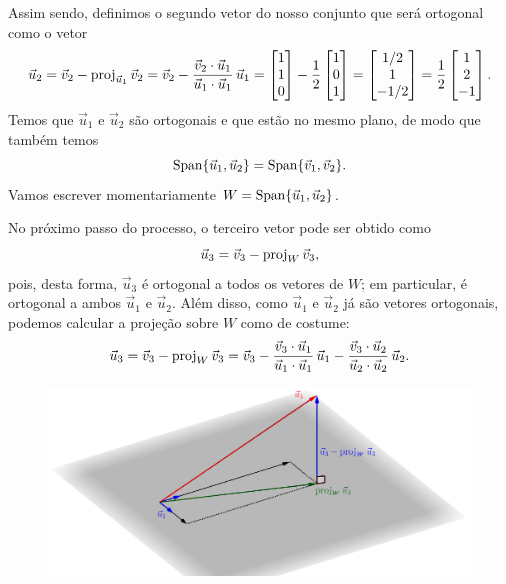 \begin{ex}
\noindent Assim sendo, definimos o segundo vetor do nosso conjunto que será ortogonal como o vetor
\begin{equation}
\vec{u}_2 = \vec{v}_2 - \operatorname{proj}_{\vec{u}_1} \vec{v}_2 = \vec{v}_2 - \frac{\vec{v}_2 \cdot \vec{u}_1}{\vec{u}_1 \cdot \vec{u}_1} \, \vec{u}_1 =
\begin{bmatrix}
1 \\ 1 \\ 0
\end{bmatrix}
- \frac{1}{2}
\begin{bmatrix}
1 \\ 0 \\ 1
\end{bmatrix} =
\begin{bmatrix}
1/2 \\ 1 \\ -1/2
\end{bmatrix} = \frac{1}{2}
\begin{bmatrix}
1 \\ 2 \\ -1
\end{bmatrix}.
\end{equation} Temos que $\vec{u}_1$ e $\vec{u}_2$ são ortogonais e que estão no mesmo plano, de modo que também temos
\begin{equation}
\operatorname{Span} \{ \vec{u}_1, \vec{u}_2 \} = \operatorname{Span} \{ \vec{v}_1, \vec{v}_2 \}.
\end{equation} Vamos escrever momentariamente $W = \operatorname{Span} \{ \vec{u}_1, \vec{u}_2 \}$.

No próximo passo do processo, o terceiro vetor pode ser obtido como
\begin{equation}
\vec{u}_3 = \vec{v}_3 - \operatorname{proj}_{W} \vec{v}_3,
\end{equation} pois, desta forma, $\vec{u}_3$ é ortogonal a todos os vetores de $W$; em particular, é ortogonal a ambos $\vec{u}_1$ e $\vec{u}_2$. Além disso, como $\vec{u}_1$ e $\vec{u}_2$ já são vetores ortogonais, podemos calcular a projeção sobre $W$ como de costume:
\begin{equation}
\vec{u}_3 = \vec{v}_3 - \operatorname{proj}_{W} \vec{v}_3 = \vec{v}_3 - \frac{\vec{v}_3 \cdot \vec{u}_1}{\vec{u}_1 \cdot \vec{u}_1} \, \vec{u}_1 - \frac{\vec{v}_3 \cdot \vec{u}_2}{\vec{u}_2 \cdot \vec{u}_2} \, \vec{u}_2.
\end{equation}
\begin{figure}[h!]
\begin{center}
\includegraphics[width=0.9\linewidth]{Semana12/semana12-gram2}
\end{center}
\end{figure}


\end{ex}
